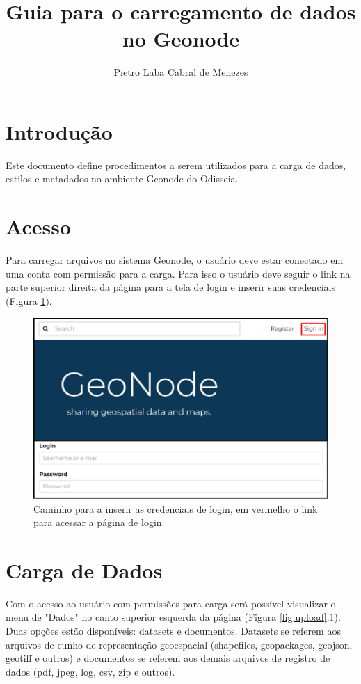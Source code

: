 \documentclass[12pt]{article}
\author{Pietro Laba Cabral de Menezes}
\begin{document}
 

\title{Guia para o carregamento de dados no Geonode}

\section{Introdução}

Este documento define procedimentos a serem utilizados para a carga de dados,
estilos e metadados no ambiente Geonode do Odisseia.

\section{Acesso} \label{sec:firstpage}

Para carregar arquivos no sistema Geonode, o usuário deve estar conectado em
uma conta com permissão para a carga. Para isso o usuário deve seguir o link na
parte superior direita da página para a tela de login e inserir suas
credenciais (Figura \ref{fig:login}).

\begin{figure}[ht]
  \centering
  \includegraphics[width=\textwidth, keepaspectratio]{img/login.pdf}
  \caption{Caminho para a inserir as credenciais de login, em vermelho o link para acessar a página de login.}
  \label{fig:login}
\end{figure}


\section{Carga de Dados}

Com o acesso ao usuário com permissões para carga será possível visualizar o
menu de "Dados" no canto superior esquerda da página (Figura
\ref{fig:upload}.1). Duas opções estão disponíveis: datasets e documentos.
Datasets se referem aos arquivos de cunho de representação geoespacial
(shapefiles, geopackages, geojson, geotiff e outros) e documentos se referem
aos demais arquivos de registro de dados (pdf, jpeg, log, csv, zip e outros).
\end{document}
